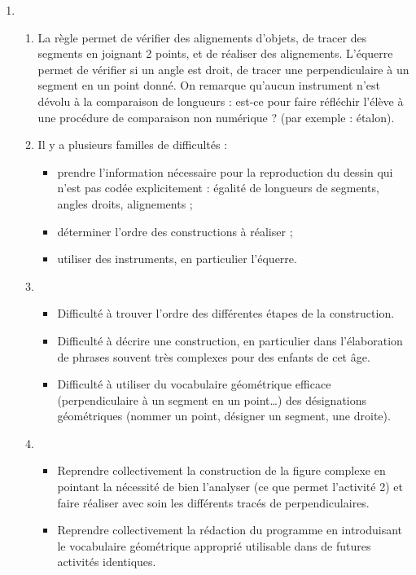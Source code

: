 \begin{enumerate}
\begin{itemize}
    \end{itemize}
   \item
   \begin{enumerate}
      \item La règle permet de vérifier des alignements d'objets, de tracer des segments en joignant 2 points, et de réaliser des alignements. L'équerre permet de vérifier si un angle est droit, de tracer une perpendiculaire à un segment en un point donné. On remarque qu'aucun instrument n'est dévolu à la comparaison de longueurs : est-ce pour faire réfléchir l'élève à une procédure de comparaison non numérique ? (par exemple : étalon).
      \item Il y a plusieurs \og familles \fg{} de difficultés :
      \begin{itemize}
         \item prendre l'information nécessaire pour la reproduction du dessin qui n'est pas codée explicitement : égalité de longueurs de segments, angles droits, alignements ;
         \item déterminer l'ordre des constructions à réaliser ;
         \item utiliser des instruments, en particulier l'équerre.
      \end{itemize}
      \item
      \begin{itemize}
         \item Difficulté à trouver l'ordre des différentes étapes de la construction.
         \item Difficulté à décrire une construction, en particulier dans l'élaboration de phrases souvent très complexes pour des enfants de cet âge.
         \item Difficulté à utiliser du vocabulaire géométrique efficace (perpendiculaire à un segment en un point\dots) des désignations géométriques (nommer un point, désigner un segment, une droite).
      \end{itemize}
      \item
      \begin{itemize}
         \item Reprendre collectivement la construction de la figure complexe en pointant la nécessité de bien l'analyser (ce que permet l'activité 2) et faire réaliser avec soin les différents tracés de perpendiculaires.
         \item Reprendre collectivement la rédaction du programme en introduisant le vocabulaire géométrique approprié utilisable dans de futures activités identiques.
   \end{itemize}
   \end{enumerate}
\end{enumerate}

